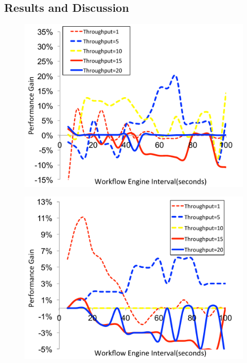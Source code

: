 \documentclass[final,5p,times,twocolumn]{elsarticle}
\begin{document}
\subsection{Results and Discussion}

\begin{figure}[!htb]
\centering
 \includegraphics[width=0.9\linewidth]{figure/MAX-MIN-Broadband.pdf}
  \label{fig:MAX-MIN-Broadband}
  \vspace{-10pt}
\end{figure}

\begin{figure}[!htb]
\centering
 \includegraphics[width=0.9\linewidth]{figure/MAX-MIN-CyberShake.pdf}
  \label{fig:MAX-MIN-CyberShake}
  \vspace{-10pt}
\end{figure}
\end{document}
